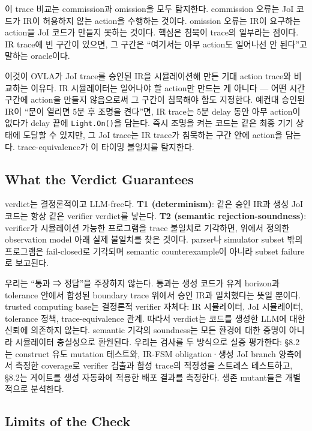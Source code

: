 \documentclass[sigconf,nonacm,anonymous,review]{acmart}
\begin{document}
이 trace 비교는 commission과 omission을 모두 탐지한다. commission 오류는 JoI 코드가 IR이 허용하지 않는 action을 수행하는 것이다. omission 오류는 IR이 요구하는 action을 JoI 코드가 만들지 못하는 것이다. 핵심은 침묵이 trace의 일부라는 점이다. IR trace에 빈 구간이 있으면, 그 구간은 ``여기서는 아무 action도 일어나선 안 된다''고 말하는 oracle이다.

이것이 OVLA가 JoI trace를 승인된 IR을 시뮬레이션해 만든 기대 action trace와 비교하는 이유다. IR 시뮬레이터는 일어나야 할 action만 만드는 게 아니다 — 어떤 시간 구간에 action을 만들지 않음으로써 그 구간이 침묵해야 함도 지정한다. 예컨대 승인된 IR이 ``문이 열리면 5분 후 조명을 켠다''면, IR trace는 5분 delay 동안 아무 action이 없다가 delay 끝에 \texttt{Light.On()}을 담는다. 즉시 조명을 켜는 코드는 같은 최종 기기 상태에 도달할 수 있지만, 그 JoI trace는 IR trace가 침묵하는 구간 안에 action을 담는다. trace-equivalence가 이 타이밍 불일치를 탐지한다.

\subsection{What the Verdict Guarantees}

verdict는 결정론적이고 LLM-free다. \textbf{T1 (determinism)}: 같은 승인 IR과 생성 JoI 코드는 항상 같은 verifier verdict를 낳는다. \textbf{T2 (semantic rejection-soundness)}: verifier가 시뮬레이션 가능한 프로그램을 trace 불일치로 기각하면, 위에서 정의한 observation model 아래 실제 불일치를 찾은 것이다. parser나 simulator subset 밖의 프로그램은 fail-closed로 기각되며 semantic counterexample이 아니라 subset failure로 보고된다.

우리는 ``통과 ⇒ 정답''을 주장하지 않는다. 통과는 생성 코드가 유계 horizon과 tolerance 안에서 합성된 boundary trace 위에서 승인 IR과 일치했다는 뜻일 뿐이다. trusted computing base는 결정론적 verifier 자체다: IR 시뮬레이터, JoI 시뮬레이터, tolerance 정책, trace-equivalence 관계. 따라서 verdict는 코드를 생성한 LLM에 대한 신뢰에 의존하지 않는다. semantic 기각의 soundness는 모든 환경에 대한 증명이 아니라 시뮬레이터 충실성으로 환원된다. 우리는 검사를 두 방식으로 실증 평가한다: \S8.2는 construct 유도 mutation 테스트와, IR-FSM obligation·생성 JoI branch 양측에서 측정한 coverage로 verifier 검출과 합성 trace의 적정성을 스트레스 테스트하고, \S8.2는 게이트를 생성 자동화에 적용한 배포 결과를 측정한다. 생존 mutant들은 개별적으로 분석한다.

\subsection{Limits of the Check}
\end{document}
